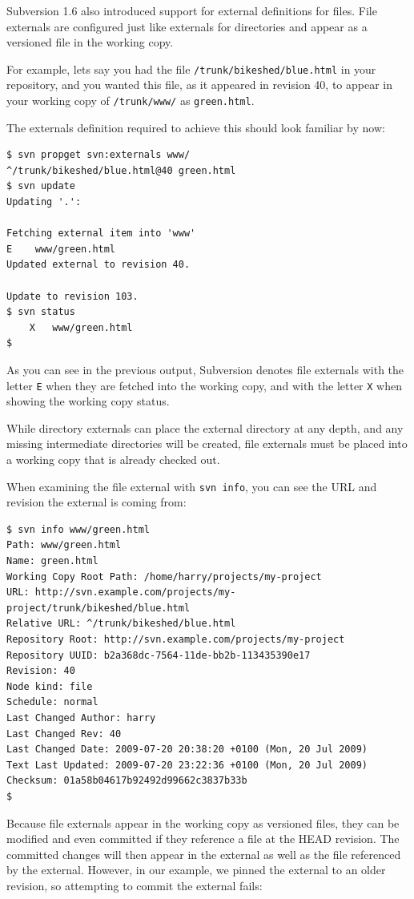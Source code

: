 Subversion 1.6 also introduced support for external definitions for
files. File externals are configured just like externals for directories
and appear as a versioned file in the working copy.

For example, let\textquotesingle s say you had the file
\texttt{/trunk/bikeshed/blue.html} in your repository, and you wanted
this file, as it appeared in revision 40, to appear in your working copy
of \texttt{/trunk/www/} as \texttt{green.html}.

The externals definition required to achieve this should look familiar
by now:

\begin{verbatim}
$ svn propget svn:externals www/
^/trunk/bikeshed/blue.html@40 green.html
$ svn update
Updating '.':

Fetching external item into 'www'
E    www/green.html
Updated external to revision 40.

Update to revision 103.
$ svn status
    X   www/green.html
$
\end{verbatim}

As you can see in the previous output, Subversion denotes file externals
with the letter \texttt{E} when they are fetched into the working copy,
and with the letter \texttt{X} when showing the working copy status.

While directory externals can place the external directory at any depth,
and any missing intermediate directories will be created, file externals
must be placed into a working copy that is already checked out.

When examining the file external with \texttt{svn\ info}, you can see
the URL and revision the external is coming from:

\begin{verbatim}
$ svn info www/green.html 
Path: www/green.html
Name: green.html
Working Copy Root Path: /home/harry/projects/my-project
URL: http://svn.example.com/projects/my-project/trunk/bikeshed/blue.html
Relative URL: ^/trunk/bikeshed/blue.html
Repository Root: http://svn.example.com/projects/my-project
Repository UUID: b2a368dc-7564-11de-bb2b-113435390e17
Revision: 40
Node kind: file
Schedule: normal
Last Changed Author: harry
Last Changed Rev: 40
Last Changed Date: 2009-07-20 20:38:20 +0100 (Mon, 20 Jul 2009)
Text Last Updated: 2009-07-20 23:22:36 +0100 (Mon, 20 Jul 2009)
Checksum: 01a58b04617b92492d99662c3837b33b
$
\end{verbatim}

Because file externals appear in the working copy as versioned files,
they can be modified and even committed if they reference a file at the
HEAD revision. The committed changes will then appear in the external as
well as the file referenced by the external. However, in our example, we
pinned the external to an older revision, so attempting to commit the
external fails:

